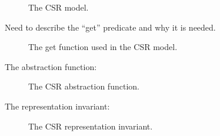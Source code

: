 \begin{figure}
\centering

\caption{The CSR model.}
\label{model:csr}
\end{figure}

Need to describe the ``get'' predicate and why it is needed.

\begin{figure}
\centering

\caption{The get function used in the CSR model.}
\label{get:csr}
\end{figure}

The abstraction function:

\begin{figure}
\centering

\caption{The CSR abstraction function.}
\label{alpha:csr}
\end{figure}

The representation invariant:

\begin{figure}
\centering

\caption{The CSR representation invariant.}
\label{repinv:csr}
\end{figure}